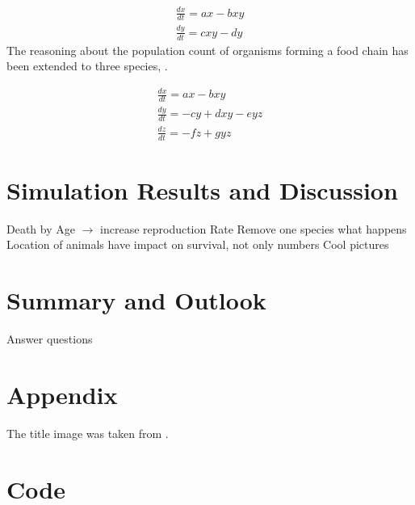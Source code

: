 \documentclass[11pt]{article}
\begin{document}
\begin{equation}
\begin{split}
\frac{dx}{dt} = ax-bxy \\ 
\frac{dy}{dt} = cxy-dy
\end{split}
\end{equation}
The reasoning about the population count of organisms forming a food chain has been extended to three species, \cite{lotkaVolterraThreeSpecies}. 

\begin{equation}
\begin{split}
\frac{dx}{dt} = ax-bxy \\ 
\frac{dy}{dt} = -cy+dxy-eyz \\ 
\frac{dz}{dt} = -fz+gyz
\end{split}
\end{equation}

\section{Simulation Results and Discussion}
Death by Age $\rightarrow$ increase reproduction Rate
Remove one species what happens
Location of animals have impact on survival, not only numbers
Cool pictures

\section{Summary and Outlook}
Answer questions

\appendix

\section{Appendix}
The title image was taken from \cite{titleImage}.

\section{Code}



\end{document}
